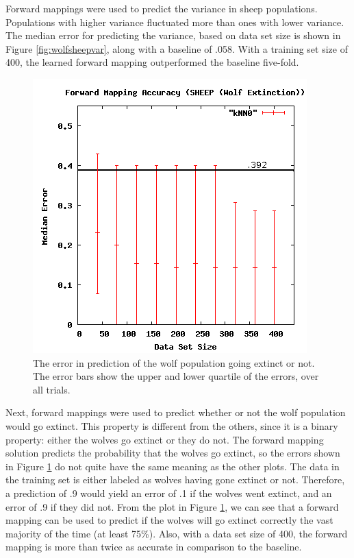 Forward mappings were used to predict the variance in sheep populations.
Populations with higher variance fluctuated more than ones with lower variance.
The median error for predicting the variance, based on data set size is shown in Figure \ref{fig:wolfsheepvar}, along with a baseline of .058.
With a training set size of 400, the learned forward mapping outperformed the baseline five-fold.

\begin{figure}[ht]
\centering
\includegraphics[scale=.5]{images/results_wolfsheep/fm-wolf-extict.png}
\caption{The error in prediction of the wolf population going extinct or not.
The error bars show the upper and lower quartile of the errors, over all trials.}
\label{fig:wolfsheepextinct}
\end{figure}

Next, forward mappings were used to predict whether or not the wolf population would go extinct.
This property is different from the others, since it is a binary property: either the wolves go extinct or they do not.
The forward mapping solution predicts the probability that the wolves go extinct, so the errors shown in Figure \ref{fig:wolfsheepextinct} do not quite have the same meaning as the other plots.
The data in the training set is either labeled as wolves having gone extinct or not.
Therefore, a prediction of .9 would yield an error of .1 if the wolves went extinct, and an error of .9 if they did not.
From the plot in Figure \ref{fig:wolfsheepextinct}, we can see that a forward mapping can be used to predict if the wolves will go extinct correctly the vast majority of the time (at least 75\%).
Also, with a data set size of 400, the forward mapping is more than twice as accurate in comparison to the baseline.

